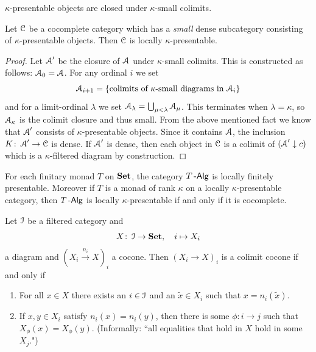 \documentclass[a4paper,11pt,oneside,openany]{scrbook}
\begin{document}
\begin{center}
	$\kappa$-presentable objects are closed under $\kappa$-small colimits.
\end{center}
\begin{prop}
	Let $\operatorname{\mathcal{C}}$ be a cocomplete category which has a \emph{small} dense subcategory consisting of $\kappa$-presentable objects. Then $\operatorname{\mathcal{C}}$ is locally $\kappa$-presentable.
\end{prop}
\begin{proof}
	Let $\operatorname{\mathcal{A}}'$ be the closure of $\operatorname{\mathcal{A}} $ under $ \kappa $-small  colimits.
	This is constructed as follows: $\operatorname{\mathcal{A}}_0 =\operatorname{\mathcal{A}} $.
	For any ordinal $ i $ we set
	\begin{displaymath}
		\operatorname{\mathcal{A}}_{i+1} = \{\text{colimits of $ \kappa $-small diagrams in $\operatorname{\mathcal{A}}_i $\}}
	\end{displaymath}
	and for a limit-ordinal $ \lambda $ we set $\operatorname{\mathcal{A}}_\lambda = \bigcup_{\mu<\lambda}\operatorname{\mathcal{A}}_{\mu} $.
	This terminates when $ \lambda = \kappa $, so $\operatorname{\mathcal{A}}_\kappa $ is the colimit closure and thus small.
	From the above mentioned fact we know that $\operatorname{\mathcal{A}}'  $ consists of $ \kappa $-presentable objects.
	Since it contains $\operatorname{\mathcal{A}} $, the inclusion $ K \colon\operatorname{\mathcal{A}}' \to \operatorname{\mathcal{C}} $ is dense.
	If $\operatorname{\mathcal{A}}' $ is dense, then each object in $ \operatorname{\mathcal{C}} $ is a colimit of $(\operatorname{\mathcal{A}}'\downarrow c)$ which is a $ \kappa $-filtered diagram by construction.
\end{proof}
\begin{cor}
	For each finitary monad $ T $ on $ {\normalfont\textbf{Set}} $, the category $ T\operatorname{-\mathsf{Alg}} $ is locally finitely presentable.
	Moreover if $ T $ is a monad of rank $ \kappa $ on a locally $ \kappa $-presentable category, then $ T\operatorname{-\mathsf{Alg}} $ is locally $ \kappa $-presentable if and only if it is cocomplete.
\end{cor}
\begin{thm}
	Let $ \operatorname{\mathcal{I}} $ be a filtered category and
	\begin{displaymath}
		X \colon \operatorname{\mathcal{I}} \to{\normalfont\textbf{Set}},\quad i \mapsto X_i
	\end{displaymath}
	a diagram and $ (X_i \xrightarrow{n_i} X)_i $ a cocone.
	Then $ (X_i \to X)_i $ is a colimit cocone if and only if
	\begin{enumerate}[label=\roman*)]
		\item For all $ x \in X $ there exists an $ i\in\operatorname{\mathcal{I}} $ and an $ \tilde x \in X_i $ such that $ x = n_i (\tilde x) $.
		\item If $ x , y \in X_i $ satisfy $ n_i(x) = n_i(y) $, then there is some $ \phi \colon i\to j $ such that $ X_\phi(x) = X_\phi(y) $.
		      (Informally: ``all equalities that hold in $ X $ hold in some $ X_j $.")
	\end{enumerate}
\end{thm}
\end{document}
